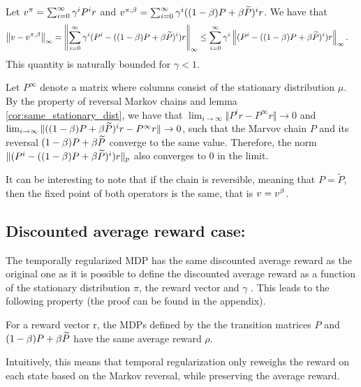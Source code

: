 \begin{proposition}
Let $v^{\pi} = \sum_{i=0}^{\infty} \gamma^i P^i r$ and $v^{\pi,\beta} = \sum_{i=0}^{\infty} \gamma^i ((1-\beta) P + \beta \widetilde{P})^i r$. We have that
\begin{equation}
    \begin{split}
        \left\lVert v - v^{\pi,\beta}\right\rVert_{\infty} &= \left\lVert\sum_{i=0}^{\infty} \gamma^i (P^i-((1-\beta) P + \beta \widetilde{P})^i) r\right\rVert_{\infty}
        \leq \sum_{i=0}^{\infty} \gamma^i \left\lVert (P^i-((1-\beta) P + \beta \widetilde{P})^i) r\right\rVert_{\infty}.
    \end{split}
\end{equation}
This quantity is naturally bounded for $\gamma < 1$.
\end{proposition}
\begin{remark}
Let $P^\infty$ denote a matrix where columns consist of the stationary distribution $\mu$.
By the property of reversal Markov chains and lemma \ref{cor:same_stationary_dist}, we have that $\lim_{i\rightarrow\infty} \Vert P^i r-P^\infty r \Vert \rightarrow 0$ and $\lim_{i\rightarrow\infty} \Vert ((1-\beta)P+\beta \widetilde{P})^i r-P^\infty r \Vert \rightarrow 0$, such that the Marvov chain $P$ and its reversal $(1-\beta)P+\beta \widetilde{P}$ converge to the same value. Therefore, the norm $\Vert  (P^i-((1-\beta) P + \beta \widetilde{P})^i) r \Vert_p$ also converges to 0 in the limit.
\end{remark}

\begin{remark}
It can be interesting to note that if the chain is reversible, meaning that $P = \widetilde{P}$, then the fixed point of both operators is the same, that is $v = v^{\beta}$.
\end{remark}

\subsection{Discounted average reward case:} The temporally regularized MDP has the same discounted average reward as the original one as it is possible to define the discounted average reward \citep{tsitsiklis2002average} as a function of the stationary distribution $\pi$, the reward vector and $\gamma$ . This leads to the following property (the proof can be found in the appendix).

\begin{proposition}
For a reward vector r, the MDPs defined by the the transition matrices $P$ and $(1-\beta) P + \beta \widetilde{P}$ have the same average reward $\rho$.
\end{proposition}
Intuitively, this means that temporal regularization only reweighs the reward on each state based on the Markov reversal, while preserving the average reward.

